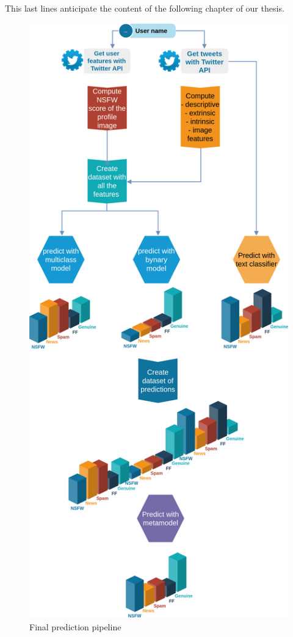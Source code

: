 This last lines anticipate the content of the following chapter of our thesis.
\begin{figure}
	\begin{center}
		\includegraphics[width=0.8\columnwidth]{chapter5/figure/prediction.png}\par 
	\end{center}
	\caption{Final prediction pipeline}
	\label{fig:prediction_pipeline}
\end{figure}